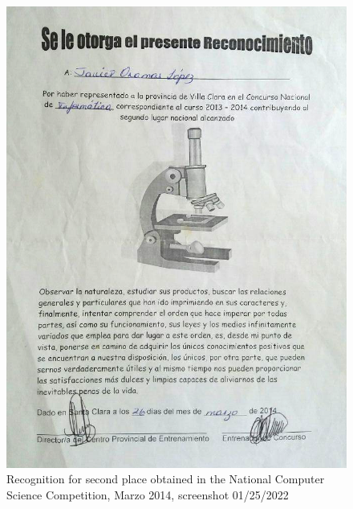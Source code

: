 \documentclass[a4paper,12pt]{article}
\begin{document}
\begin{figure}[h]
    \centering
    \includegraphics[width=\textwidth]{images/informatica.png}
    \caption{Recognition for second place obtained in the National Computer Science Competition, Marzo 2014, screenshot 01/25/2022}
    \label{sec:informatic}
\end{figure}


\end{document}
